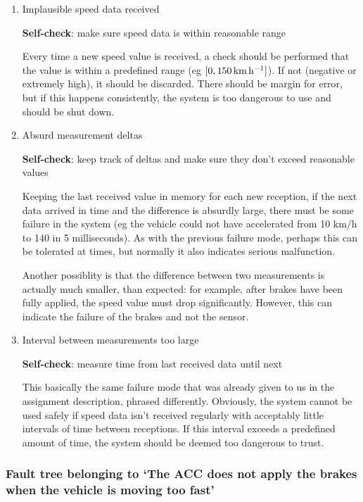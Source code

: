 \documentclass[a4paper]{article}
\begin{document}
\begin{enumerate}
	\item Implausible speed data received

		\textbf{Self-check}: make sure speed data is within reasonable
		range

		Every time a new speed value is received, a check should be
		performed that the value is within a predefined range (eg
		\(\interval{0}{\SI{150}{\km\per\hour}}\)). If not
		(negative or extremely high), it should be discarded. There
		should be margin for error, but if this happens consistently,
		the system is too dangerous to use and should be shut down.

	\item Absurd measurement deltas

		\textbf{Self-check}: keep track of deltas and make sure they
		don't exceed reasonable values

		Keeping the last received value in memory for each new
		reception, if the next data arrived in time and the difference
		is absurdly large, there must be some failure in the system (eg
		the vehicle could not have accelerated from 10
		\(\si{\km\per\hour}\) to 140 in 5 milliseconds). As with
		the previous failure mode, perhaps this can be tolerated at
		times, but normally it also indicates serious malfunction.

		Another possiblity is that the difference between two
		measurements is actually much smaller, than expected: for
		example, after brakes have been fully applied, the speed value
		must drop significantly. However, this can indicate the failure
		of the brakes and not the sensor.

	\item Interval between measurements too large

		\textbf{Self-check}: measure time from last received data until
		next

		This basically the same failure mode that was already given to
		us in the assignment description, phrased differently.
		Obviously, the system cannot be used safely if speed data isn't
		received regularly with acceptably little intervals of time
		between receptions. If this interval exceeds a predefined amount
		of time, the system should be deemed too dangerous to trust.
\end{enumerate}

\subsubsection{Fault tree belonging to ‘The ACC does not apply the brakes when
               the vehicle is moving too fast’}
\end{document}
